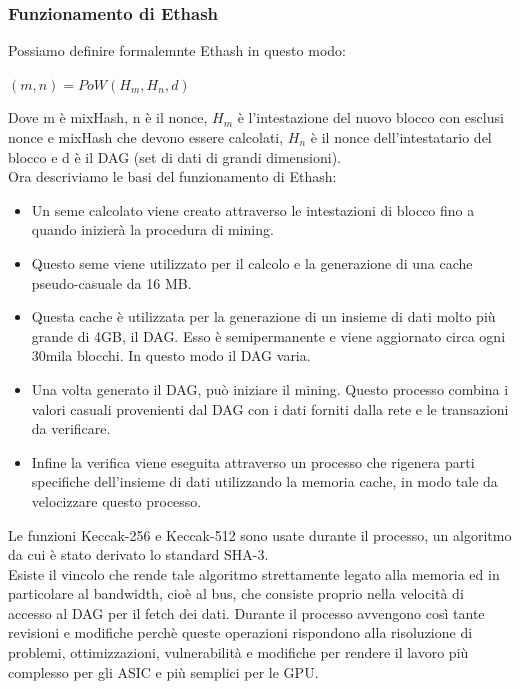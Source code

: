 \documentclass[a4paper,11pt]{report}
\begin{document}
\subsubsection{Funzionamento di Ethash}
Possiamo definire formalemnte Ethash in questo modo:\\
\begin{center}
$ (m,n) = PoW(\textit{H}_{m},\textit{H}_{n},d) $
\end{center}
Dove m è mixHash, n è il nonce, $H_{m}$ è l'intestazione del nuovo blocco con esclusi nonce e mixHash che devono essere calcolati, $H_{n}$ è il nonce dell'intestatario del blocco e d è il DAG (set di dati di grandi dimensioni).\\
Ora descriviamo le basi del funzionamento di Ethash:
\begin{itemize}
\item Un seme calcolato viene creato attraverso le intestazioni di blocco fino a quando inizierà la procedura di mining.
\item  Questo seme viene utilizzato per il calcolo e la generazione di una cache pseudo-casuale da 16 MB.
\item Questa cache è utilizzata per la generazione di un insieme di dati molto più grande di 4GB, il DAG. Esso è semipermanente e viene aggiornato circa ogni 30mila blocchi. In questo modo il DAG varia.
\item Una volta generato il DAG, può iniziare il mining. Questo processo combina i valori casuali provenienti dal DAG con i dati forniti dalla rete e le transazioni da verificare.
\item Infine la verifica viene eseguita attraverso un processo che rigenera parti specifiche dell'insieme di dati utilizzando la memoria cache, in modo tale da velocizzare questo processo.\\
\end{itemize}
Le funzioni Keccak-256 e Keccak-512 sono usate durante il processo, un algoritmo da cui è stato derivato lo standard SHA-3.\\
Esiste il vincolo che rende tale algoritmo strettamente legato alla memoria ed in particolare al bandwidth, cioè al bus, che consiste proprio nella velocità di accesso al DAG per il fetch dei dati.
Durante il processo avvengono così tante revisioni e modifiche perchè queste operazioni rispondono alla risoluzione di problemi, ottimizzazioni, vulnerabilità e modifiche per rendere il lavoro più complesso per gli ASIC e più semplici per le GPU.\\
\end{document}
